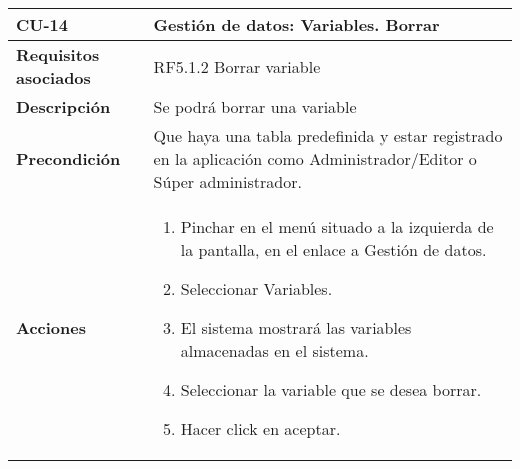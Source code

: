 \newpage
\begin{longtable}[H]{@{}ll@{}}
\toprule
\begin{minipage}[b]{0.23\columnwidth}\raggedright\strut
\textbf{CU-14}\strut
\end{minipage} & \begin{minipage}[b]{0.71\columnwidth}\raggedright\strut
\textbf{Gestión de datos: Variables. Borrar}\strut
\end{minipage}\tabularnewline
\midrule
\endhead
\begin{minipage}[t]{0.23\columnwidth}\raggedright\strut
\textbf{Requisitos asociados}\strut
\end{minipage} & \begin{minipage}[t]{0.71\columnwidth}\raggedright\strut
RF5.1.2 Borrar variable\strut
\end{minipage}\tabularnewline
\begin{minipage}[t]{0.23\columnwidth}\raggedright\strut
\textbf{Descripción}\strut
\end{minipage} & \begin{minipage}[t]{0.71\columnwidth}\raggedright\strut
Se podrá borrar una variable
\strut
\end{minipage}\tabularnewline
\begin{minipage}[t]{0.23\columnwidth}\raggedright\strut
\textbf{Precondición}\strut
\end{minipage} & \begin{minipage}[t]{0.71\columnwidth}\raggedright\strut
Que haya una tabla predefinida y estar registrado en la aplicación como Administrador/Editor o Súper administrador.\strut
\end{minipage}\tabularnewline
\begin{minipage}[t]{0.23\columnwidth}\raggedright\strut
\textbf{Acciones}\strut
\end{minipage} & \begin{minipage}[t]{0.71\columnwidth}\raggedright\strut
\begin{enumerate}
\def\labelenumi{\arabic{enumi}.}
\tightlist
\item
Pinchar en el menú situado a la izquierda de la pantalla, en el
enlace a Gestión de datos.
\item
Seleccionar Variables.
\item
El sistema mostrará las variables almacenadas en el sistema.
\item
Seleccionar la variable que se desea borrar.
\item
Hacer click en aceptar.
\end{enumerate}\strut

\end{minipage}
\end{longtable}
